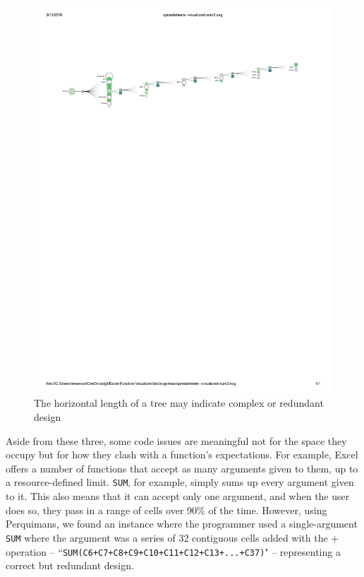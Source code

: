\documentclass[conference]{IEEEtran}
\newcommand{\toolname}{Perquimans\xspace} \newcommand{\toolnameend}{Perquimans}
\begin{document}
	\begin{figure}[h] \centering \includegraphics[width=\textwidth]{longsum}
		\caption{The horizontal length of a tree may indicate complex or redundant
			design} \label{fig:longsum} \end{figure}
	
	Aside from these three, some code issues are meaningful not for the space they
	occupy but for how they clash with a function's expectations. For example,
	Excel offers a number of functions that accept as many arguments given to
	them, up to a resource-defined limit. \texttt{SUM}, for example, simply sums up every
	argument given to it. This also means that it can accept only one argument, and
	when the user does so, they pass in a range of cells over 90\% of the time.
	However, using \toolname, we found an instance where the programmer used a
	single-argument \texttt{SUM} where the argument was a series of 32 contiguous cells
	added with the + operation -- ``\texttt{SUM(C6+C7+C8+C9+C10+C11+C12+C13+...+C37)}" --
	representing a correct but redundant design.
	
\end{document}
